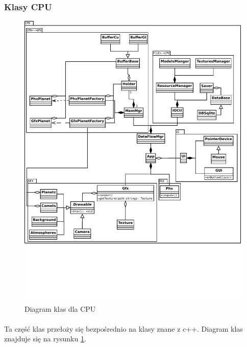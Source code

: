 \subsubsection{Klasy CPU}

\begin{figure}[ht!]
	\centering
	\includegraphics[angle=0,width=\textwidth]{class_cpu.pdf}
	\caption{Diagram klas dla CPU}
	\label{fig:class_cpu}
\end{figure}

\paragraph{}
Ta część klas przełoży się bezpośrednio na klasy znane z c++. Diagram klas znajduje się na rysunku \ref{fig:class_cpu}.

